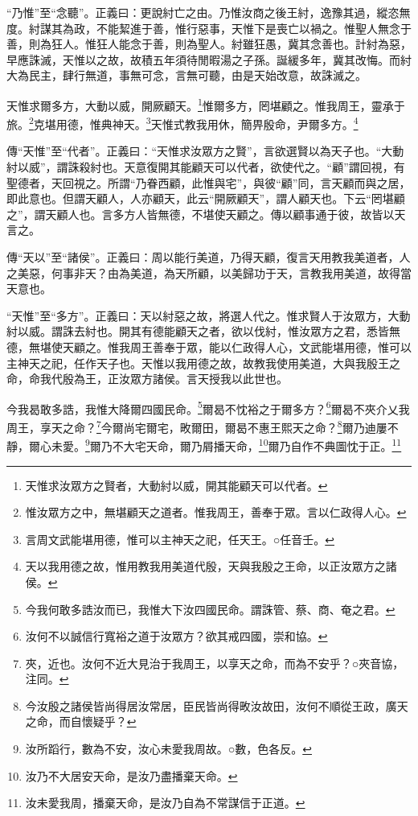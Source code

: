 {\noindent\shu{}\fzkt “乃惟”至“念聽”。正義曰：更說紂亡之由。乃惟汝商之後王紂，逸豫其過，縱恣無度。紂謀其為政，不能絜進于善，惟行惡事，天惟下是喪亡以禍之。惟聖人無念于善，則為狂人。惟狂人能念于善，則為聖人。紂雖狂愚，冀其念善也。計紂為惡，早應誅滅，天惟以之故，故積五年須待閒暇湯之子孫。誕緩多年，冀其改悔。而紂大為民主，肆行無道，事無可念，言無可聽，由是天始改意，故誅滅之。 \par}

天惟求爾多方，大動以威，開厥顧天。\footnote{天惟求汝眾方之賢者，大動紂以威，開其能顧天可以代者。}惟爾多方，罔堪顧之。惟我周王，靈承于旅。\footnote{惟汝眾方之中，無堪顧天之道者。惟我周王，善奉于眾。言以仁政得人心。}克堪用德，惟典神天。\footnote{言周文武能堪用德，惟可以主神天之祀，任天王。○任音壬。}天惟式教我用休，簡畀殷命，尹爾多方。\footnote{天以我用德之故，惟用教我用美道代殷，天與我殷之王命，以正汝眾方之諸侯。}


{\noindent\zhuan{}\fzbyks 傳“天惟”至“代者”。正義曰：“天惟求汝眾方之賢”，言欲選賢以為天子也。“大動紂以威”，謂誅殺紂也。天意復開其能顧天可以代者，欲使代之。“顧”謂回視，有聖德者，天回視之。所謂“乃眷西顧，此惟與宅”，與彼“顧”同，言天顧而與之居，即此意也。但謂天顧人，人亦顧天，此云“開厥顧天”，謂人顧天也。下云“罔堪顧之”，謂天顧人也。言多方人皆無德，不堪使天顧之。傳以顧事通于彼，故皆以天言之。 \par}

{\noindent\zhuan{}\fzbyks 傳“天以”至“諸侯”。正義曰：周以能行美道，乃得天顧，復言天用教我美道者，人之美惡，何事非天？由為美道，為天所顧，以美歸功于天，言教我用美道，故得當天意也。 \par}

{\noindent\shu{}\fzkt “天惟”至“多方”。正義曰：天以紂惡之故，將選人代之。惟求賢人于汝眾方，大動紂以威。謂誅去紂也。開其有德能顧天之者，欲以伐紂，惟汝眾方之君，悉皆無德，無堪使天顧之。惟我周王善奉于眾，能以仁政得人心，文武能堪用德，惟可以主神天之祀，任作天子也。天惟以我用德之故，故教我使用美道，大與我殷王之命，命我代殷為王，正汝眾方諸侯。言天授我以此世也。 \par}

今我曷敢多誥，我惟大降爾四國民命。\footnote{今我何敢多誥汝而已，我惟大下汝四國民命。謂誅管、蔡、商、奄之君。}爾曷不忱裕之于爾多方？\footnote{汝何不以誠信行寬裕之道于汝眾方？欲其戒四國，崇和協。}爾曷不夾介乂我周王，享天之命？\footnote{夾，近也。汝何不近大見治于我周王，以享天之命，而為不安乎？○夾音協，注同。}今爾尚宅爾宅，畋爾田，爾曷不惠王熙天之命？\footnote{今汝殷之諸侯皆尚得居汝常居，臣民皆尚得畋汝故田，汝何不順從王政，廣天之命，而自懷疑乎？}爾乃迪屢不靜，爾心未愛。\footnote{汝所蹈行，數為不安，汝心未愛我周故。○數，色各反。}爾乃不大宅天命，爾乃屑播天命，\footnote{汝乃不大居安天命，是汝乃盡播棄天命。}爾乃自作不典圖忱于正。\footnote{汝未愛我周，播棄天命，是汝乃自為不常謀信于正道。}


